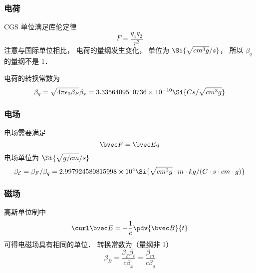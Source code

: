
\begin{issues}
\issueDraft
\end{issues}


\subsubsection{电荷}
CGS 单位满足库伦定律
\begin{equation}
F = \frac{q_1 q_2}{r^2}
\end{equation}
注意与国际单位相比， 电荷的量纲发生变化， 单位为 $\Si{\sqrt{cm^3 g}/s}$， 所以 $\beta_q$ 的量纲不是 1．

电荷的转换常数为
\begin{equation}
\beta_q = \sqrt{4\pi\epsilon_0\beta_F} \beta_x = 3.3356409510736\times 10^{-10} \Si{Cs/\sqrt{cm^3 g}}
\end{equation}

\subsubsection{电场}
电场需要满足
\begin{equation}
\bvec F = \bvec E q
\end{equation}
电场单位为 $\Si{\sqrt{g/cm}/s}$
\begin{equation}
\beta_{\mathcal E} = \beta_F/\beta_q = 2.997924580815998\times 10^4 \Si{\sqrt{cm^3 g}\cdot m\cdot kg/(C\cdot s\cdot cm\cdot g)}
\end{equation}

\subsubsection{磁场}
高斯单位制中
\begin{equation}
\curl \bvec E = -\frac{1}{c} \pdv{\bvec B}{t}
\end{equation}
可得电磁场具有相同的单位． 转换常数为（量纲非 1）
\begin{equation}
\beta_B = \frac{\beta_{\mathcal E}\beta_t}{c\beta_x} = \frac{\beta_m}{c\beta_q}
\end{equation}
